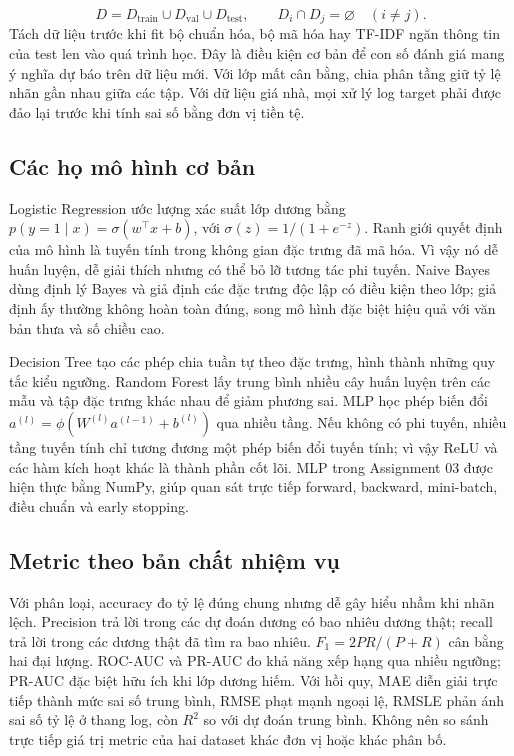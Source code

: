 \documentclass[12pt,a4paper]{report}
\begin{document}
\begin{equation}D=D_{\mathrm{train}}\cup D_{\mathrm{val}}\cup D_{\mathrm{test}},\qquad D_i\cap D_j=\varnothing\quad(i\ne j).\end{equation}
Tách dữ liệu trước khi fit bộ chuẩn hóa, bộ mã hóa hay TF-IDF ngăn thông tin của test len vào quá trình học. Đây là điều kiện cơ bản để con số đánh giá mang ý nghĩa dự báo trên dữ liệu mới. Với lớp mất cân bằng, chia phân tầng giữ tỷ lệ nhãn gần nhau giữa các tập. Với dữ liệu giá nhà, mọi xử lý log target phải được đảo lại trước khi tính sai số bằng đơn vị tiền tệ.

\subsection{Các họ mô hình cơ bản}
Logistic Regression ước lượng xác suất lớp dương bằng $p(y=1\mid x)=\sigma(w^\top x+b)$, với $\sigma(z)=1/(1+e^{-z})$. Ranh giới quyết định của mô hình là tuyến tính trong không gian đặc trưng đã mã hóa. Vì vậy nó dễ huấn luyện, dễ giải thích nhưng có thể bỏ lỡ tương tác phi tuyến. Naive Bayes dùng định lý Bayes và giả định các đặc trưng độc lập có điều kiện theo lớp; giả định ấy thường không hoàn toàn đúng, song mô hình đặc biệt hiệu quả với văn bản thưa và số chiều cao.

Decision Tree tạo các phép chia tuần tự theo đặc trưng, hình thành những quy tắc kiểu ngưỡng. Random Forest lấy trung bình nhiều cây huấn luyện trên các mẫu và tập đặc trưng khác nhau để giảm phương sai. MLP học phép biến đổi $a^{(l)}=\phi(W^{(l)}a^{(l-1)}+b^{(l)})$ qua nhiều tầng. Nếu không có phi tuyến, nhiều tầng tuyến tính chỉ tương đương một phép biến đổi tuyến tính; vì vậy ReLU và các hàm kích hoạt khác là thành phần cốt lõi. MLP trong Assignment 03 được hiện thực bằng NumPy, giúp quan sát trực tiếp forward, backward, mini-batch, điều chuẩn và early stopping.

\subsection{Metric theo bản chất nhiệm vụ}
Với phân loại, accuracy đo tỷ lệ đúng chung nhưng dễ gây hiểu nhầm khi nhãn lệch. Precision trả lời trong các dự đoán dương có bao nhiêu dương thật; recall trả lời trong các dương thật đã tìm ra bao nhiêu. $F_1=2PR/(P+R)$ cân bằng hai đại lượng. ROC-AUC và PR-AUC đo khả năng xếp hạng qua nhiều ngưỡng; PR-AUC đặc biệt hữu ích khi lớp dương hiếm. Với hồi quy, MAE diễn giải trực tiếp thành mức sai số trung bình, RMSE phạt mạnh ngoại lệ, RMSLE phản ánh sai số tỷ lệ ở thang log, còn $R^2$ so với dự đoán trung bình. Không nên so sánh trực tiếp giá trị metric của hai dataset khác đơn vị hoặc khác phân bố.
\end{document}
